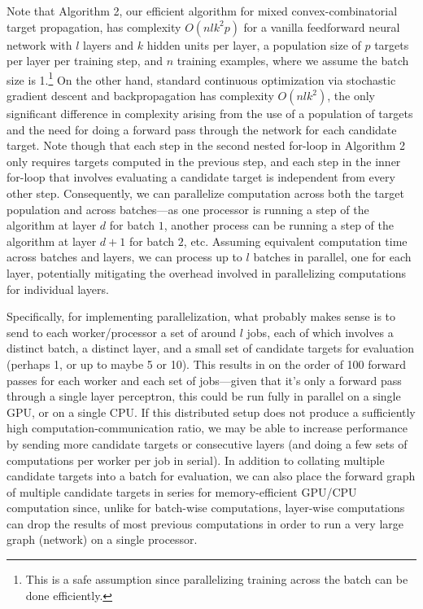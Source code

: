 \documentclass[12pt,letterpaper]{article}
\begin{document}
Note that Algorithm 2, our efficient algorithm for mixed convex-combinatorial target propagation, has complexity $O(nlk^{2}p)$ for a vanilla feedforward neural network with $l$ layers and $k$ hidden units per layer, a population size of $p$ targets per layer per training step, and $n$ training examples, where we assume the batch size is 1.\footnote{This is a safe assumption since parallelizing training across the batch can be done efficiently.} On the other hand, standard continuous optimization via stochastic gradient descent and backpropagation has complexity $O(nlk^{2})$, the only significant difference in complexity arising from the use of a population of targets and the need for doing a forward pass through the network for each candidate target. Note though that each step in the second nested for-loop in Algorithm 2 only requires targets computed in the previous step, and each step in the inner for-loop that involves evaluating a candidate target is independent from every other step. Consequently, we can parallelize computation across both the target population and across batches---as one processor is running a step of the algorithm 
at layer $d$ for batch $1$, another process can be running a step of the algorithm at layer $d+1$ for batch $2$, etc. Assuming equivalent computation time across batches and layers, we can process up to $l$ batches in parallel, one for each layer, potentially mitigating the overhead involved in parallelizing computations for individual layers. 

Specifically, for implementing parallelization, what probably makes sense is to send to each worker/processor a set of around $l$ jobs, each of which involves a distinct batch, a distinct layer, and a small set of candidate targets for evaluation (perhaps 1, or up to maybe 5 or 10). This results in on the order of 100 forward passes for each worker and each set of jobs---given that it's only a forward pass through a single layer perceptron, this could be run fully in parallel on a single GPU, or on a single CPU. If this distributed setup does not produce a sufficiently high computation-communication ratio, we may be able to increase performance by sending more candidate targets or consecutive layers (and doing a few sets of computations per worker per job in serial). In addition to collating multiple candidate targets into a batch for evaluation, we can also place the forward graph of multiple candidate targets in series for memory-efficient GPU/CPU computation since, unlike for batch-wise computations, layer-wise computations can drop the results of most previous computations in order to run a very large graph (network) on a single processor. 
\end{document}
